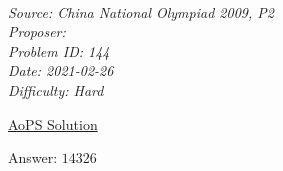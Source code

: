 \SSbreak\\
\emph{Source: China National Olympiad 2009, P2}\\
\emph{Proposer: \Pmatt}\\ %
\emph{Problem ID: 144}\\
\emph{Date: 2021-02-26}\\
\emph{Difficulty: Hard}\\
\SSbreak

\bigskip

\begin{solution}\hfil\medskip
	
	\href{https://artofproblemsolving.com/community/c6h250256p1371288}{AoPS Solution} \medskip
	
	Answer: \(\boxed{14326}\)
\end{solution}\bigskip
